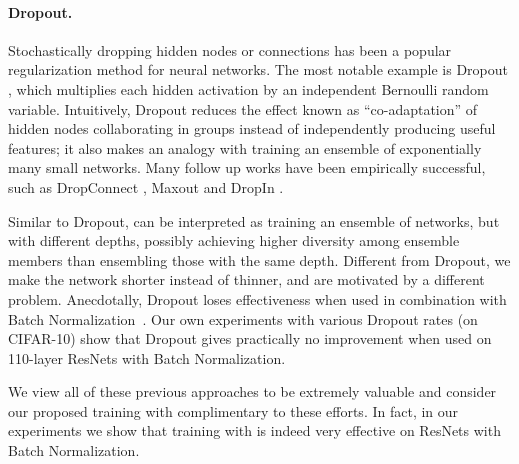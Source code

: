 \paragraph{\textbf{Dropout.}} Stochastically dropping hidden nodes or connections has been a popular regularization method for neural networks. The most notable example is Dropout \cite{srivastava2014dropout}, which multiplies each hidden activation by an independent Bernoulli random variable. Intuitively, Dropout reduces the effect known as ``co-adaptation'' of hidden nodes collaborating in groups instead of independently producing useful features; it also makes an analogy with training an ensemble of exponentially many small networks. Many follow up works have been empirically successful, such as DropConnect \cite{icml2013_wan13}, Maxout \cite{goodfellow2013maxout} and DropIn \cite{smith2015gradual}.

Similar to Dropout, \name{} can be interpreted as training an ensemble of networks, but with different depths, possibly achieving higher diversity among ensemble members than ensembling those with the same depth. Different from Dropout, we make the network shorter instead of thinner, and are motivated by a different problem. Anecdotally, Dropout loses effectiveness when used in combination with Batch Normalization~\cite{ioffe2015batch,blogpostcifar10}. Our own experiments with various Dropout rates (on CIFAR-10) show that Dropout gives practically no improvement when used on 110-layer ResNets with Batch Normalization.

We view all of these previous approaches to be extremely valuable and consider our proposed training with \name{} complimentary to these efforts. In fact, in our experiments we show that training with \name{} is indeed very effective on ResNets with Batch Normalization.
